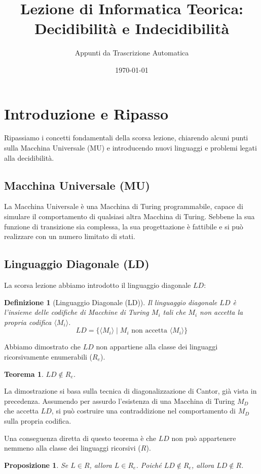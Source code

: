 \documentclass[a4paper]{article}
\title{Lezione di Informatica Teorica: Decidibilità e Indecidibilità}
\author{Appunti da Trascrizione Automatica}
\date{\today}
\makeatletter
\newtheorem{theorem}{Teorema}[section] %
\newtheorem{definition}{Definizione}[section] %
\newtheorem{proposition}{Proposizione}[section]
\renewenvironment{proof}[1][\proofname]{\par
  \pushQED{\qed}%
  \normalfont \topsep6\p@\@plus6\p@\relax
  \trivlist
  \item[\hskip\labelsep
        \bfseries
    #1\@addpunct{.}]\ignorespaces
}{%
  \popQED\endtrivlist\@endpefalse
}
\makeatother
\begin{document}
\maketitle
\tableofcontents
\newpage

\section{Introduzione e Ripasso}
Ripassiamo i concetti fondamentali della scorsa lezione, chiarendo alcuni punti sulla Macchina Universale (MU) e introducendo nuovi linguaggi e problemi legati alla decidibilità.

\subsection{Macchina Universale (MU)}
La Macchina Universale è una Macchina di Turing programmabile, capace di simulare il comportamento di qualsiasi altra Macchina di Turing. Sebbene la sua funzione di transizione sia complessa, la sua progettazione è fattibile e si può realizzare con un numero limitato di stati.

\subsection{Linguaggio Diagonale (LD)}
La scorsa lezione abbiamo introdotto il linguaggio diagonale $LD$:
\begin{definition}[Linguaggio Diagonale (LD)]
Il linguaggio diagonale $LD$ è l'insieme delle codifiche di Macchine di Turing $M_i$ tali che $M_i$ non accetta la propria codifica $\langle M_i \rangle$.
\[ LD = \{ \langle M_i \rangle \mid M_i \text{ non accetta } \langle M_i \rangle \} \]
\end{definition}

Abbiamo dimostrato che $LD$ non appartiene alla classe dei linguaggi ricorsivamente enumerabili ($R_e$).
\begin{theorem}
$LD \notin R_e$.
\end{theorem}
\begin{proof}
La dimostrazione si basa sulla tecnica di diagonalizzazione di Cantor, già vista in precedenza. Assumendo per assurdo l'esistenza di una Macchina di Turing $M_D$ che accetta $LD$, si può costruire una contraddizione nel comportamento di $M_D$ sulla propria codifica.
\end{proof}

Una conseguenza diretta di questo teorema è che $LD$ non può appartenere nemmeno alla classe dei linguaggi ricorsivi ($R$).
\begin{proposition}
Se $L \in R$, allora $L \in R_e$.
Poiché $LD \notin R_e$, allora $LD \notin R$.
\end{proposition}
\end{document}
